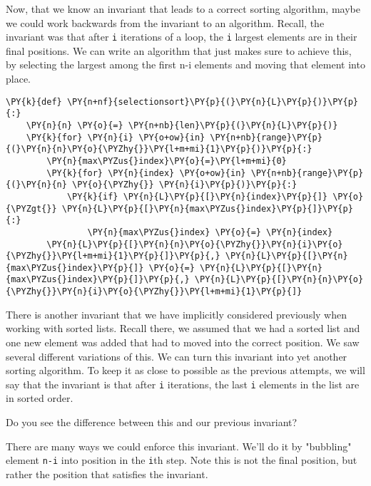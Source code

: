 Now, that we know an invariant that leads to a correct sorting algorithm, maybe we could work backwards from the invariant to an algorithm.  Recall, the invariant was that after \texttt{i} iterations of a loop, the \texttt{i} largest elements are in their final positions.  We can write an algorithm that just makes sure to achieve this, by selecting the largest among the first n-i elements and moving that element into place.

\begin{Verbatim}[commandchars=\\\{\}]
\PY{k}{def} \PY{n+nf}{selectionsort}\PY{p}{(}\PY{n}{L}\PY{p}{)}\PY{p}{:}
    \PY{n}{n} \PY{o}{=} \PY{n+nb}{len}\PY{p}{(}\PY{n}{L}\PY{p}{)}
    \PY{k}{for} \PY{n}{i} \PY{o+ow}{in} \PY{n+nb}{range}\PY{p}{(}\PY{n}{n}\PY{o}{\PYZhy{}}\PY{l+m+mi}{1}\PY{p}{)}\PY{p}{:}
        \PY{n}{max\PYZus{}index}\PY{o}{=}\PY{l+m+mi}{0}        
        \PY{k}{for} \PY{n}{index} \PY{o+ow}{in} \PY{n+nb}{range}\PY{p}{(}\PY{n}{n} \PY{o}{\PYZhy{}} \PY{n}{i}\PY{p}{)}\PY{p}{:}
            \PY{k}{if} \PY{n}{L}\PY{p}{[}\PY{n}{index}\PY{p}{]} \PY{o}{\PYZgt{}} \PY{n}{L}\PY{p}{[}\PY{n}{max\PYZus{}index}\PY{p}{]}\PY{p}{:}
                \PY{n}{max\PYZus{}index} \PY{o}{=} \PY{n}{index}
        \PY{n}{L}\PY{p}{[}\PY{n}{n}\PY{o}{\PYZhy{}}\PY{n}{i}\PY{o}{\PYZhy{}}\PY{l+m+mi}{1}\PY{p}{]}\PY{p}{,} \PY{n}{L}\PY{p}{[}\PY{n}{max\PYZus{}index}\PY{p}{]} \PY{o}{=} \PY{n}{L}\PY{p}{[}\PY{n}{max\PYZus{}index}\PY{p}{]}\PY{p}{,} \PY{n}{L}\PY{p}{[}\PY{n}{n}\PY{o}{\PYZhy{}}\PY{n}{i}\PY{o}{\PYZhy{}}\PY{l+m+mi}{1}\PY{p}{]}
\end{Verbatim}



There is another invariant that we have implicitly considered previously when working with sorted lists.  Recall there, we assumed that we had a sorted list and one new element was added that had to moved into the correct position.  We saw several different variations of this.  We can turn this invariant into yet another sorting algorithm.  To keep it as close to possible as the previous attempts, we will say that the invariant is that after \texttt{i} iterations, the last \texttt{i} elements in the list are in sorted order.  


Do you see the difference between this and our previous invariant?


There are many ways we could enforce this invariant.  We'll do it by "bubbling" element \texttt{n-i} into position in the \texttt{i}th step.  Note this is not the final position, but rather the position that satisfies the invariant.

